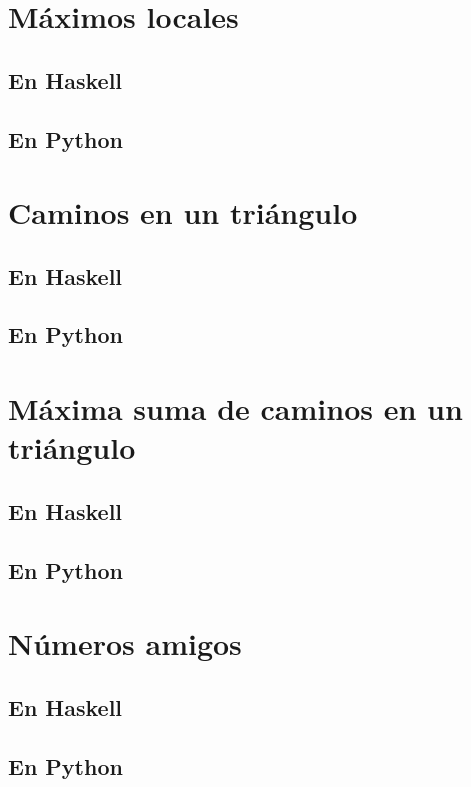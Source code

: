 \documentclass[a4paper,12pt,twoside]{book}
\begin{document}
\section{Máximos locales}
\subsection{En Haskell}
\subsection{En Python}

\section{Caminos en un triángulo}
\subsection{En Haskell}
\subsection{En Python}

\section{Máxima suma de caminos en un triángulo}
\subsection{En Haskell}
\subsection{En Python}

\section{Números amigos}
\subsection{En Haskell}
\subsection{En Python}
\end{document}
